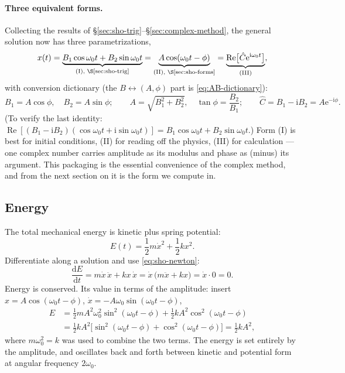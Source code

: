 \documentclass[11pt]{article}
\theoremstyle{plain}
\theoremstyle{definition}
\theoremstyle{remark}
\newcommand{\dd}{\mathrm{d}}
\newcommand{\ee}{\mathrm{e}}
\newcommand{\ii}{\mathrm{i}}
\newcommand{\Rre}{\operatorname{Re}}
\begin{document}
\paragraph{Three equivalent forms.}
Collecting the results of \S\ref{sec:sho-trig}--\S\ref{sec:complex-method},
the general solution now has three parametrizations,
\begin{equation}
  x(t)
  = \underbrace{B_1\cos\omega_0 t + B_2 \sin\omega_0 t}_{\text{(I), \S\ref{sec:sho-trig}}}
  = \underbrace{A\cos(\omega_0 t - \phi)}_{\text{(II), \S\ref{sec:sho-forms}}}
  = \underbrace{\Rre\bigl[\hat C \ee^{\ii\omega_0 t}\bigr]}_{\text{(III)}} ,
\end{equation}
with conversion dictionary (the $B\leftrightarrow(A,\phi)$ part is
\eqref{eq:AB-dictionary}):
\begin{equation}
  B_1 = A\cos\phi, \quad
  B_2 = A\sin\phi;
  \qquad
  A = \sqrt{B_1^2+B_2^2}, \quad
  \tan\phi = \frac{B_2}{B_1};
  \qquad
  \hat C = B_1 - \ii B_2 = A \ee^{-\ii\phi}.
\end{equation}
(To verify the last identity:
$\Rre[(B_1-\ii B_2)(\cos\omega_0 t + \ii\sin\omega_0 t)]
 = B_1\cos\omega_0 t + B_2\sin\omega_0 t$.)
Form (I) is best for initial conditions, (II) for reading off the physics,
(III) for calculation --- one complex number carries amplitude as its
modulus and phase as (minus) its argument. This packaging is the essential
convenience of the complex method, and from the next section on it is the
form we compute in.

\subsection{Energy}

The total mechanical energy is kinetic plus spring potential:
\begin{equation}
  E(t) = \frac12 m \dot x^2 + \frac12 k x^2 .
\end{equation}
Differentiate along a solution and use \eqref{eq:sho-newton}:
\begin{equation}
  \frac{\dd E}{\dd t}
  = m\dot x\, \ddot x + k x\, \dot x
  = \dot x\,\bigl(m\ddot x + kx\bigr)
  = \dot x \cdot 0
  = 0 .
\end{equation}
Energy is conserved. Its value in terms of the amplitude: insert
$x = A\cos(\omega_0 t - \phi)$, $\dot x = -A\omega_0 \sin(\omega_0 t -\phi)$,
\begin{align}
  E &= \frac12 m A^2\omega_0^2 \sin^2(\omega_0 t-\phi)
     + \frac12 k A^2 \cos^2(\omega_0 t-\phi)
  \nonumber\\
    &= \frac12 k A^2\bigl[\sin^2(\omega_0 t - \phi) + \cos^2(\omega_0 t-\phi)\bigr]
     = \frac12 k A^2 ,
\end{align}
where $m\omega_0^2 = k$ was used to combine the two terms. The energy is set
entirely by the amplitude, and oscillates back and forth between kinetic and
potential form at angular frequency $2\omega_0$.
\end{document}
